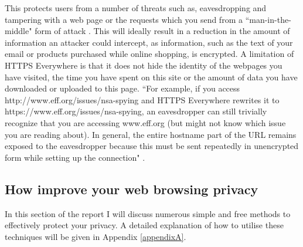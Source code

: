 \documentclass[12pt]{article}
\begin{document}
This protects users from a number of threats such as, eavesdropping and tampering with a web page or the requests which you send from a ``man-in-the-middle" form of attack \parencite{httpsEverywhere}. This will ideally result in a reduction in the amount of information an attacker could intercept, as information, such as the text of your email or products purchased while online shopping, is encrypted. A limitation of HTTPS Everywhere is that it does not hide the identity of the webpages you have visited, the time you have spent on this site or the amount of data you have downloaded or uploaded to this page. ``For example, if you access http://www.eff.org/issues/nsa-spying and HTTPS Everywhere rewrites it to https://www.eff.org/issues/nsa-spying, an eavesdropper can still trivially recognize that you are accessing www.eff.org (but might not know which issue you are reading about). In general, the entire hostname part of the URL remains exposed to the eavesdropper because this must be sent repeatedly in unencrypted form while setting up the connection" \parencite{httpsEverywhere}.

\subsection{How improve your web browsing privacy}
In this section of the report I will discuss numerous simple and free methods to effectively protect your privacy. A detailed explanation of how to utilise these techniques will be given in Appendix \ref{appendixA}. 
\end{document}
